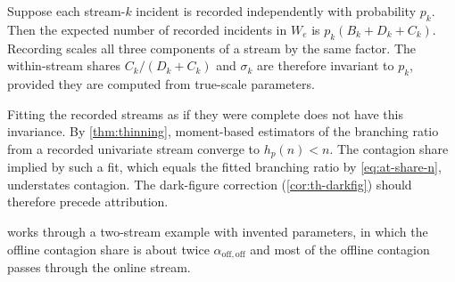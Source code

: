 \begin{remark}\label{rem:at-thinning}
Suppose each stream-$k$ incident is recorded independently with probability $p_k$. Then
the expected number of recorded incidents in $W_e$ is $p_k(B_k+D_k+C_k)$. Recording
scales all three components of a stream by the same factor. The within-stream shares
$C_k/(D_k+C_k)$ and $\sigma_k$ are therefore invariant to $p_k$, provided they are
computed from true-scale parameters.

Fitting the recorded streams as if they were complete does not have this invariance. By
\cref{thm:thinning}, moment-based estimators of the branching ratio from a recorded
univariate stream converge to $h_p(n)<n$. The contagion share implied by such a fit,
which equals the fitted branching ratio by \eqref{eq:at-share-n}, understates
contagion. The dark-figure correction (\cref{cor:th-darkfig}) should therefore precede
attribution.
\end{remark}

 works through a two-stream example with invented parameters, in
which the offline contagion share is about twice $\alpha_{\mathrm{off},\mathrm{off}}$ and
most of the offline contagion passes through the online stream.
